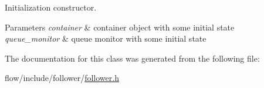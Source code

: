 Initialization constructor. 


\begin{DoxyParams}{Parameters}
{\em container} & container object with some initial state \\
\hline
{\em queue\+\_\+monitor} & queue monitor with some initial state \\
\hline
\end{DoxyParams}


The documentation for this class was generated from the following file\+:\begin{DoxyCompactItemize}
\item 
flow/include/follower/\hyperlink{follower_8h}{follower.\+h}\end{DoxyCompactItemize}
